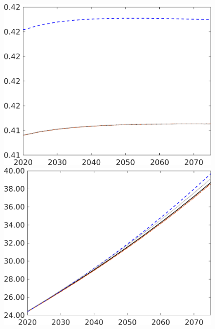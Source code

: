 \begin{figure}[h!!]
\begin{minipage}[]{0.32\textwidth}
\includegraphics[width=1\textwidth]{../../codding_model/own_basedOnFried/optimalPol_010922_revision/figures/all_5Sept22/CompRed_TaulCalib_EY_spillover0_nsk0_xgr0_sep1_LFlimit0_emsbase0_countec0_GovRev1_etaa0.79_lgd0.png}
\end{minipage}
\begin{minipage}[]{0.32\textwidth}
\includegraphics[width=1\textwidth]{../../codding_model/own_basedOnFried/optimalPol_010922_revision/figures/all_5Sept22/CompRed_TaulCalib_A_spillover0_nsk0_xgr0_sep1_LFlimit0_emsbase0_countec0_GovRev1_etaa0.79_lgd0.png}

\end{minipage}
\end{figure}
